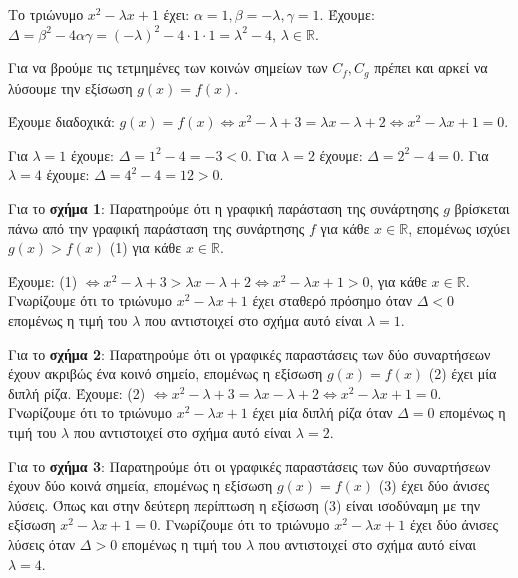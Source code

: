 
\begin{alist}
\item Το τριώνυμο $x^2 - \lambda x + 1$ έχει: $\alpha = 1, \beta = -\lambda, \gamma = 1$.
Έχουμε: $\Delta = \beta^2 - 4\alpha\gamma = (-\lambda)^2 - 4 \cdot 1 \cdot 1 = \lambda^2 - 4$, $\lambda \in \mathbb{R}$.

\item
\begin{rlist}
\item Για να βρούμε τις τετμημένες των κοινών σημείων των $C_f, C_g$ πρέπει και αρκεί να λύσουμε την εξίσωση $g(x) = f(x)$.

Έχουμε διαδοχικά: $g(x) = f(x) \Leftrightarrow x^2 - \lambda + 3 = \lambda x - \lambda + 2 \Leftrightarrow x^2 - \lambda x + 1 = 0$.

\item Για $\lambda = 1$ έχουμε: $\Delta = 1^2 - 4 = -3 < 0$.
Για $\lambda = 2$ έχουμε: $\Delta = 2^2 - 4 = 0$.
Για $\lambda = 4$ έχουμε: $\Delta = 4^2 - 4 = 12 > 0$.

Για το \textbf{σχήμα 1}: Παρατηρούμε ότι η γραφική παράσταση της συνάρτησης $g$ βρίσκεται πάνω από την γραφική παράσταση της συνάρτησης $f$ για κάθε $x \in \mathbb{R}$, επομένως ισχύει
$g(x) > f(x)$ (1) για κάθε $x \in \mathbb{R}$.

Έχουμε: (1) $\Leftrightarrow x^2 - \lambda + 3 > \lambda x - \lambda + 2 \Leftrightarrow x^2 - \lambda x + 1 > 0$, για κάθε $x \in \mathbb{R}$.
Γνωρίζουμε ότι το τριώνυμο $x^2 - \lambda x + 1$ έχει σταθερό πρόσημο όταν $\Delta < 0$ επομένως η τιμή του $\lambda$ που αντιστοιχεί στο σχήμα αυτό είναι $\lambda = 1$.

Για το \textbf{σχήμα 2}: Παρατηρούμε ότι οι γραφικές παραστάσεις των δύο συναρτήσεων έχουν ακριβώς ένα κοινό σημείο, επομένως η εξίσωση $g(x) = f(x)$ (2) έχει μία διπλή ρίζα.
Έχουμε: (2) $\Leftrightarrow x^2 - \lambda + 3 = \lambda x - \lambda + 2 \Leftrightarrow x^2 - \lambda x + 1 = 0$.
Γνωρίζουμε ότι το τριώνυμο $x^2 - \lambda x + 1$ έχει μία διπλή ρίζα όταν $\Delta = 0$ επομένως η τιμή του $\lambda$ που αντιστοιχεί στο σχήμα αυτό είναι $\lambda = 2$.

Για το \textbf{σχήμα 3}: Παρατηρούμε ότι οι γραφικές παραστάσεις των δύο συναρτήσεων έχουν δύο κοινά σημεία, επομένως η εξίσωση $g(x) = f(x)$ (3) έχει δύο άνισες λύσεις.
Όπως και στην δεύτερη περίπτωση η εξίσωση (3) είναι ισοδύναμη με την εξίσωση $x^2 - \lambda x + 1 = 0$.
Γνωρίζουμε ότι το τριώνυμο $x^2 - \lambda x + 1$ έχει δύο άνισες λύσεις όταν $\Delta > 0$ επομένως η τιμή του $\lambda$ που αντιστοιχεί στο σχήμα αυτό είναι $\lambda = 4$.
\end{rlist}
\end{alist}

